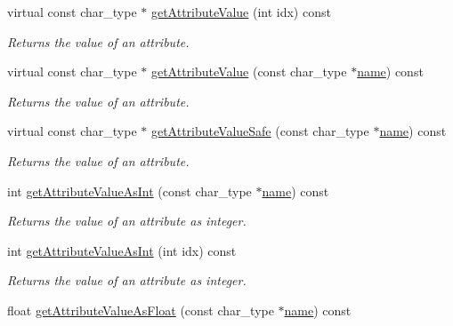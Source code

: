 \begin{CompactItemize}
virtual const char\_\-type $\ast$ \hyperlink{classirr_1_1io_1_1_c_x_m_l_reader_impl_55bc001ac65fa308a04b65bc1529aa4b}{getAttributeValue} (int idx) const 
\begin{CompactList}\small\item\em Returns the value of an attribute. \item\end{CompactList}\item 
virtual const char\_\-type $\ast$ \hyperlink{classirr_1_1io_1_1_c_x_m_l_reader_impl_7252bf5d02f9cc05ade31e658502116a}{getAttributeValue} (const char\_\-type $\ast$\hyperlink{glext__bak_8h_bb62efe59ccdd153ce42e1a418352209}{name}) const 
\begin{CompactList}\small\item\em Returns the value of an attribute. \item\end{CompactList}\item 
virtual const char\_\-type $\ast$ \hyperlink{classirr_1_1io_1_1_c_x_m_l_reader_impl_f8ff476656b98b9f491b453c8093b77b}{getAttributeValueSafe} (const char\_\-type $\ast$\hyperlink{glext__bak_8h_bb62efe59ccdd153ce42e1a418352209}{name}) const 
\begin{CompactList}\small\item\em Returns the value of an attribute. \item\end{CompactList}\item 
int \hyperlink{classirr_1_1io_1_1_c_x_m_l_reader_impl_5d532267e6e4ac8fcb402671842c32c9}{getAttributeValueAsInt} (const char\_\-type $\ast$\hyperlink{glext__bak_8h_bb62efe59ccdd153ce42e1a418352209}{name}) const 
\begin{CompactList}\small\item\em Returns the value of an attribute as integer. \item\end{CompactList}\item 
int \hyperlink{classirr_1_1io_1_1_c_x_m_l_reader_impl_8c8cf8e6560299e3315cd1a75477bd53}{getAttributeValueAsInt} (int idx) const 
\begin{CompactList}\small\item\em Returns the value of an attribute as integer. \item\end{CompactList}\item 
float \hyperlink{classirr_1_1io_1_1_c_x_m_l_reader_impl_89fb9f69bba65c76e23d6519bcb5df7d}{getAttributeValueAsFloat} (const char\_\-type $\ast$\hyperlink{glext__bak_8h_bb62efe59ccdd153ce42e1a418352209}{name}) const 

\end{CompactItemize}

